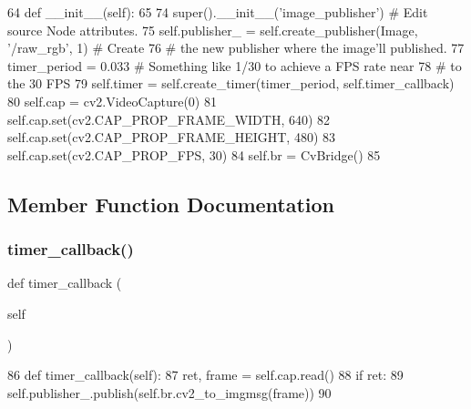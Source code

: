 \begin{DoxyCode}
64     \textcolor{keyword}{def }\_\_init\_\_(self):
65         
74         super().\_\_init\_\_(\textcolor{stringliteral}{'image\_publisher'}) \textcolor{comment}{# Edit source Node attributes.}
75         self.publisher\_ = self.create\_publisher(Image, \textcolor{stringliteral}{'/raw\_rgb'}, 1) \textcolor{comment}{# Create}
76         \textcolor{comment}{# the new publisher where the image'll published.}
77         timer\_period = 0.033 \textcolor{comment}{# Something like 1/30 to achieve a FPS rate near}
78         \textcolor{comment}{# to the 30 FPS}
79         self.timer = self.create\_timer(timer\_period, self.timer\_callback)
80         self.cap = cv2.VideoCapture(0)
81         self.cap.set(cv2.CAP\_PROP\_FRAME\_WIDTH, 640)
82         self.cap.set(cv2.CAP\_PROP\_FRAME\_HEIGHT, 480)
83         self.cap.set(cv2.CAP\_PROP\_FPS, 30)
84         self.br = CvBridge()
85 
\end{DoxyCode}


\subsection{Member Function Documentation}
\mbox{\label{classtoxic__vision_1_1webcam__pub_1_1ImagePublisher_a9692d7a212fa89bc61dacc687e826097}} 
\subsubsection{\texorpdfstring{timer\+\_\+callback()}{timer\_callback()}}
{\footnotesize\ttfamily def timer\+\_\+callback (\begin{DoxyParamCaption}\item[{}]{self }\end{DoxyParamCaption})}


\begin{DoxyCode}
86     \textcolor{keyword}{def }timer\_callback(self):
87         ret, frame = self.cap.read()
88         \textcolor{keywordflow}{if} ret:
89             self.publisher\_.publish(self.br.cv2\_to\_imgmsg(frame))
90 
\end{DoxyCode}



